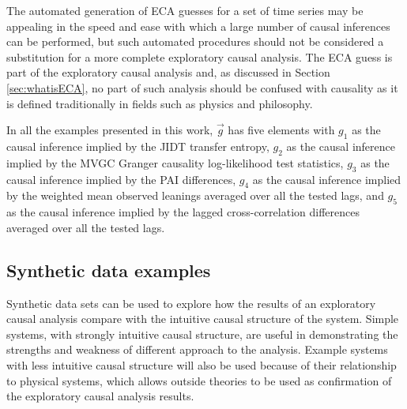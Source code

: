 \documentclass{article}[10pt]
\begin{document}
The automated generation of ECA guesses for a set of time series may be appealing in the speed and ease with which a large number of causal inferences can be performed, but such automated procedures should not be considered a substitution for a more complete exploratory causal analysis.  The ECA guess is part of the exploratory causal analysis and, as discussed in Section \ref{sec:whatisECA}, no part of such analysis should be confused with causality as it is defined traditionally in fields such as physics and philosophy.

In all the examples presented in this work, $\vec{g}$ has five elements with $g_1$ as the causal inference implied by the JIDT transfer entropy, $g_2$ as the causal inference implied by the MVGC Granger causality log-likelihood test statistics, $g_3$ as the causal inference implied by the PAI differences, $g_4$ as the causal inference implied by the weighted mean observed leanings averaged over all the tested lags, and $g_5$ as the causal inference implied by the lagged cross-correlation differences averaged over all the tested lags.

\subsection{Synthetic data examples}
Synthetic data sets can be used to explore how the results of an exploratory causal analysis compare with the intuitive causal structure of the system.  Simple systems, with strongly intuitive causal structure, are useful in demonstrating the strengths and weakness of different approach to the analysis.  Example systems with less intuitive causal structure will also be used because of their relationship to physical systems, which allows outside theories to be used as confirmation of the exploratory causal analysis results. 
\end{document}
